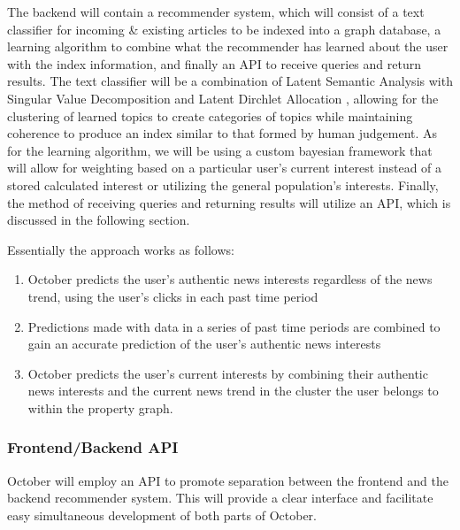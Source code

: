 \documentclass[11pt,letterpaper]{article}
\begin{document}
The backend will contain a recommender system, which will consist of a text
classifier for incoming \& existing articles to be indexed into a graph
database, a learning algorithm to combine what the recommender has learned about
the user with the index information, and finally an API to receive queries and
return results. The text classifier will be a combination of Latent Semantic
Analysis with Singular Value Decomposition and Latent Dirchlet Allocation
\cite{lda}, allowing for the clustering of learned topics to create categories
of topics while maintaining coherence to produce an index similar to that formed
by human judgement. As for the learning algorithm, we will be using a custom
bayesian framework \cite{bayesian} that will allow for weighting based on a particular user's current interest instead of a stored calculated interest or utilizing the general population's interests.
Finally, the method of receiving queries and returning results will utilize an API, which is discussed in the following section.

Essentially the approach works as follows:
    \begin{enumerate}
        \item October predicts the user’s authentic news interests regardless of the news trend, using the user’s clicks in each past time period
        \item Predictions made with data in a series of past time periods are combined to gain an accurate prediction of the user’s authentic news interests
        \item October predicts the user’s current interests by combining their authentic news interests and the current news trend in the cluster the user belongs to within the property graph.
    \end{enumerate}

\subsubsection{Frontend/Backend API}
October will employ an API to promote separation between the frontend and the backend recommender system.
This will provide a clear interface and facilitate easy simultaneous development of both parts of October.
\end{document}
